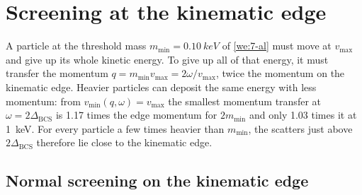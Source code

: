 \section{Screening at the kinematic edge}\label{sec:15.2}

A particle at the threshold mass $m_{\mathrm{min}} = \SI{0.10}{keV}$ of \cref{we:7-al} must move at $v_{\mathrm{max}}$ and give up its whole kinetic energy. To give up all of that energy, it must transfer the momentum $q = m_{\mathrm{min}}v_{\mathrm{max}} = 2\omega/v_{\mathrm{max}}$, twice the momentum on the kinematic edge. Heavier particles can deposit the same energy with less momentum: from $v_{\mathrm{min}}(q,\omega) = v_{\mathrm{max}}$ the smallest momentum transfer at $\omega = 2\Delta_{\mathrm{BCS}}$ is 1.17 times the edge momentum for $2m_{\mathrm{min}}$ and only 1.03 times it at \SI{1}{keV}. For every particle a few times heavier than $m_{\mathrm{min}}$, the scatters just above $2\Delta_{\mathrm{BCS}}$ therefore lie close to the kinematic edge.

\subsection{Normal screening on the kinematic edge}\label{sec:15.2-resum}

